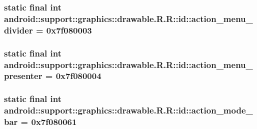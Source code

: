 \hypertarget{classandroid_1_1support_1_1graphics_1_1drawable_1_1_r_1_1id_e9d83d9bfb481152ff2db8c7bd620519}{
\subsubsection[{action\_\-menu\_\-divider}]{\setlength{\rightskip}{0pt plus 5cm}static final int android::support::graphics::drawable.R.R::id::action\_\-menu\_\-divider = 0x7f080003}}
\label{classandroid_1_1support_1_1graphics_1_1drawable_1_1_r_1_1id_e9d83d9bfb481152ff2db8c7bd620519}


\hypertarget{classandroid_1_1support_1_1graphics_1_1drawable_1_1_r_1_1id_e5b0bde8ade2399e9b18d69dcb6cf23a}{
\subsubsection[{action\_\-menu\_\-presenter}]{\setlength{\rightskip}{0pt plus 5cm}static final int android::support::graphics::drawable.R.R::id::action\_\-menu\_\-presenter = 0x7f080004}}
\label{classandroid_1_1support_1_1graphics_1_1drawable_1_1_r_1_1id_e5b0bde8ade2399e9b18d69dcb6cf23a}


\hypertarget{classandroid_1_1support_1_1graphics_1_1drawable_1_1_r_1_1id_ea2817e3ddf3bda1cbd3a21528cf96b3}{
\subsubsection[{action\_\-mode\_\-bar}]{\setlength{\rightskip}{0pt plus 5cm}static final int android::support::graphics::drawable.R.R::id::action\_\-mode\_\-bar = 0x7f080061}}
\label{classandroid_1_1support_1_1graphics_1_1drawable_1_1_r_1_1id_ea2817e3ddf3bda1cbd3a21528cf96b3}


